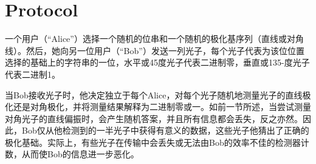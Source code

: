 \section{Protocol}


一个用户（“Alice”）选择一个随机的位串和一个随机的极化基序列（直线或对角线）。然后，她向另一位用户（“Bob”）发送一列光子，每个光子代表为该位位置选择的基础上的字符串的一位，水平或45度光子代表二进制零，垂直或135-度光子代表二进制1。

当Bob接收光子时，他决定独立于每个Alice，对每个光子随机地测量光子的直线极化还是对角极化，并将测量结果解释为二进制零或一。如前一节所述，当尝试测量对角光子的直线偏振时，会产生随机答案，并且所有信息都会丢失，反之亦然。因此，Bob仅从他检测到的一半光子中获得有意义的数据，这些光子他猜出了正确的极化基础。实际上，有些光子在传输中会丢失或无法由Bob的效率不佳的检测器计数，从而使Bob的信息进一步恶化。


